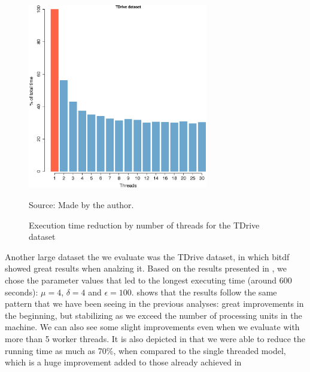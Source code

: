 {\begin{figure}[h!]
    \centering
    \caption{Execution time reduction by number of threads for the TDrive dataset}
    \centerline{\includegraphics[width=0.7\textwidth]{images/TDrive_thread.eps}}
    \footnotesize{Source: Made by the author.}
    \label{fig:tdrive_threads}
\end{figure}

Another large dataset the we evaluate was the TDrive dataset, in which \ac{bitdf} showed great results when analzing it.
Based on the results presented in , we chose the parameter values that led to the longest executing
time (around 600 seconds): $\mu=4$, $\delta=4$ and $\epsilon=100$.  shows that the results
follow the same pattern that we have been seeing in the previous analyses: great improvements in the beginning, but
stabilizing as we exceed the number of processing units in the machine. We can also see some slight improvements even
when we evaluate with more than 5 worker threads. It is also depicted in  that we were able
to reduce the running time as much as 70\%, when compared to the single threaded model, which is a huge improvement
added to those already achieved in 

}
